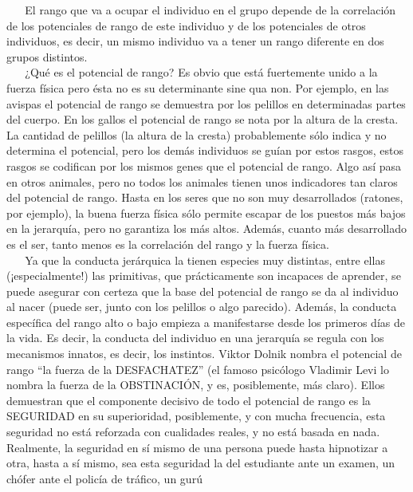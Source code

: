 \hspace*{0.333em} ~ ~ El rango que va a ocupar el individuo en el grupo
depende de la correlación de los potenciales de rango de este individuo
y de los potenciales de otros individuos, es decir, un mismo individuo
va a tener un rango diferente en dos grupos distintos.\\
\hspace*{0.333em} ~ ~ ¿Qué es el potencial de rango? Es obvio que está
fuertemente unido a la fuerza física pero ésta no es su determinante
sine qua non. Por ejemplo, en las avispas el potencial de rango se
demuestra por los pelillos en determinadas partes del cuerpo. En los
gallos el potencial de rango se nota por la altura de la cresta. La
cantidad de pelillos (la altura de la cresta) probablemente sólo indica
y no determina el potencial, pero los demás individuos se guían por
estos rasgos, estos rasgos se codifican por los mismos genes que el
potencial de rango. Algo así pasa en otros animales, pero no todos los
animales tienen unos indicadores tan claros del potencial de rango.
Hasta en los seres que no son muy desarrollados (ratones, por ejemplo),
la buena fuerza física sólo permite escapar de los puestos más bajos en
la jerarquía, pero no garantiza los más altos. Además, cuanto más
desarrollado es el ser, tanto menos es la correlación del rango y la
fuerza física.\\
\hspace*{0.333em} ~ ~ Ya que la conducta jerárquica la tienen especies
muy distintas, entre ellas (¡especialmente!) las primitivas, que
prácticamente son incapaces de aprender, se puede asegurar con certeza
que la base del potencial de rango se da al individuo al nacer (puede
ser, junto con los pelillos o algo parecido). Además, la conducta
específica del rango alto o bajo empieza a manifestarse desde los
primeros días de la vida. Es decir, la conducta del individuo en una
jerarquía se regula con los mecanismos innatos, es decir, los instintos.
Viktor Dolnik nombra el potencial de rango ``la fuerza de la
DESFACHATEZ'' (el famoso psicólogo Vladimir Levi lo nombra la fuerza de
la OBSTINACIÓN, y es, posiblemente, más claro). Ellos demuestran que el
componente decisivo de todo el potencial de rango es la SEGURIDAD en su
superioridad, posiblemente, y con mucha frecuencia, esta seguridad no
está reforzada con cualidades reales, y no está basada en nada.
Realmente, la seguridad en sí mismo de una persona puede hasta
hipnotizar a otra, hasta a sí mismo, sea esta seguridad la del
estudiante ante un examen, un chófer ante el policía de tráfico, un gurú
